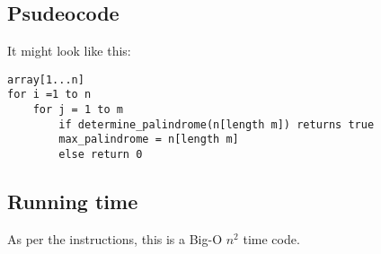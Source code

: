 \documentclass{article}
\begin{document}
\subsection{Psudeocode}
It might look like this: \newline
\begin{lstlisting}
array[1...n]
for i =1 to n
	for j = 1 to m
		if determine_palindrome(n[length m]) returns true
		max_palindrome = n[length m]
		else return 0
\end{lstlisting}
\subsection{Running time}
As per the instructions, this is a Big-O $n^{2}$ time code.
\end{document}

